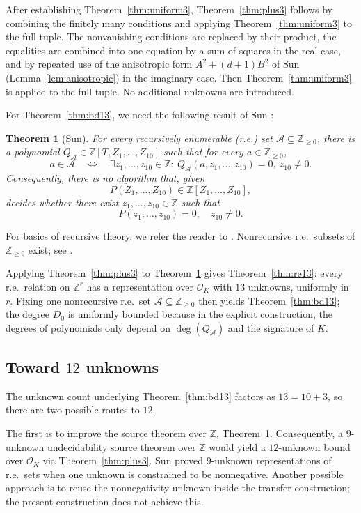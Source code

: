 \documentclass[12pt]{amsart}
\numberwithin{equation}{section}
\newtheorem{theorem}{Theorem}[section]
\theoremstyle{remark}
\theoremstyle{plain}
\newcommand{\Z}{\mathbb{Z}}
\newcommand{\sO}{\mathcal{O}}
\newcommand{\sA}{\mathcal{A}}
\begin{document}
After establishing Theorem~\ref{thm:uniform3}, Theorem~\ref{thm:plus3} follows by combining the finitely many conditions and applying Theorem~\ref{thm:uniform3} to the full tuple. The nonvanishing conditions are replaced by their product, the equalities are combined into one equation by a sum of squares in the real case, and by repeated use of the anisotropic form $A^2+(d+1)B^2$ of Sun (Lemma~\ref{lem:anisotropic}) in the imaginary case. Then Theorem~\ref{thm:uniform3} is applied to the full tuple. No additional unknowns are introduced.

\medskip

For Theorem~\ref{thm:bd13}, we need the following result of Sun \cite[Theorem~1.1(ii)]{Sun21}:
\begin{theorem}[Sun]\label{thm:source}
	For every recursively enumerable (r.e.) set $\sA\subseteq\Z_{\geq0}$, there is a polynomial $Q_{\sA}\in\Z[T,Z_1,\ldots,Z_{10}]$ such that for every $a\in\Z_{\geq0}$,
	\[
	a\in\sA\quad\Longleftrightarrow\quad\exists z_1,\ldots,z_{10}\in\Z\colon\ Q_{\sA}(a,z_1,\ldots,z_{10})=0,\ z_{10}\neq0.
	\]
	Consequently, there is no algorithm that, given
	\[
	P(Z_1,\ldots,Z_{10})\in\Z[Z_1,\ldots,Z_{10}],
	\]
	decides whether there exist $z_1,\ldots,z_{10}\in\Z$ such that
	\[
	P(z_1,\ldots,z_{10})=0,\quad z_{10}\neq0.
	\]
\end{theorem}
For basics of recursive theory, we refer the reader to \cite{Cutland}. Nonrecursive r.e.\ subsets of $\Z_{\geq0}$ exist; see \cite[\S~7.4]{Cutland}.

Applying Theorem~\ref{thm:plus3} to Theorem~\ref{thm:source} gives Theorem~\ref{thm:re13}: every r.e.\ relation on $\Z^r$ has a representation over $\sO_K$ with $13$ unknowns, uniformly in $r$. Fixing one nonrecursive r.e.\ set $\sA\subseteq\Z_{\geq0}$ then yields Theorem~\ref{thm:bd13}; the degree $D_0$ is uniformly bounded because in the explicit construction, the degrees of polynomials only depend on $\deg(Q_{\sA})$ and the signature of $K$.

\subsection{Toward $12$ unknowns}
The unknown count underlying Theorem~\ref{thm:bd13} factors as $13=10+3$, so there are two possible routes to $12$.

The first is to improve the source theorem over $\Z$, Theorem~\ref{thm:source}. Consequently, a $9$-unknown undecidability source theorem over $\Z$ would yield a $12$-unknown bound over $\sO_K$ via Theorem~\ref{thm:plus3}. Sun \cite[Theorem~1.1(i)]{Sun21} proved $9$-unknown representations of r.e.\ sets when one unknown is constrained to be nonnegative. Another possible approach is to reuse the nonnegativity unknown inside the transfer construction; the present construction does not achieve this.
\end{document}
